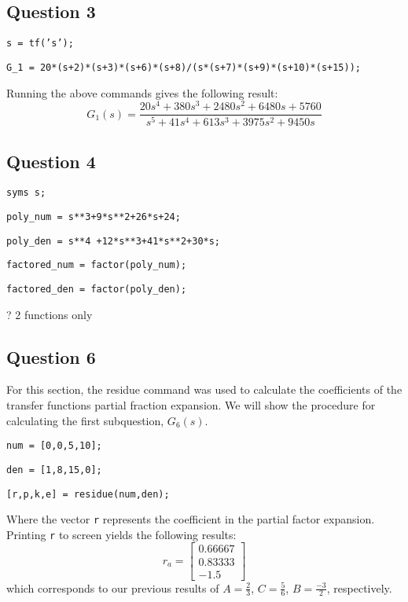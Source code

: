 \documentclass[12pt, a4paper]{article}
\begin{document}
		\subsection*{Question 3} %
		\label{sub:question_3}
			\texttt{s = tf('s');} \par\noindent
			\texttt{G\_1 = 20*(s+2)*(s+3)*(s+6)*(s+8)/(s*(s+7)*(s+9)*(s+10)*(s+15));}

			\noindent Running the above commands gives the following result:
			\[
				G_1(s) = \frac{20 s^4 + 380 s^3 + 2480 s^2 + 6480 s + 5760}{s^5 + 41 s^4 + 613 s^3 + 3975 s^2 + 9450 s}
			\]


		\subsection*{Question 4} %
		\label{sub:question_4}
		\texttt{syms s;}\par\noindent
		\texttt{poly\_num = s**3+9*s**2+26*s+24;}\par\noindent
		\texttt{poly\_den = s**4 +12*s**3+41*s**2+30*s;}\par\noindent
		\texttt{factored\_num = factor(poly\_num);}\par\noindent
		\texttt{factored\_den = factor(poly\_den);}\par\noindent
		? 2 functions only 


		\subsection*{Question 6} %
		\label{sub:question_6}
			For this section, the residue command was used to calculate the coefficients of the transfer functions partial fraction expansion. We will show the procedure for calculating the first subquestion, $G_6(s)$.

			\noindent\texttt{num = [0,0,5,10];}\par\noindent
			\texttt{den = [1,8,15,0];}\par\noindent
			\texttt{[r,p,k,e] = residue(num,den);}

			\noindent Where the vector \texttt{r} represents the coefficient in the partial factor expansion. Printing \texttt{r} to screen yields the following results:
			\[
				r_a =
				\begin{bmatrix}
					0.66667 \\
					0.83333 \\
					-1.5
				\end{bmatrix}
			\]
			which corresponds to our previous results of $A=\tfrac{2}{3}$, $C=\tfrac{5}{6}$, $B=\tfrac{-3}{2}$, respectively.
\end{document}
